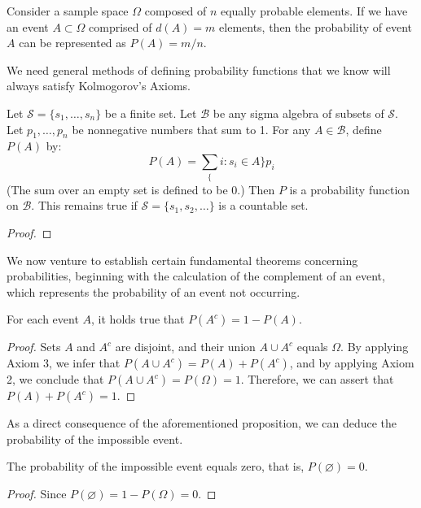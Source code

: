 \begin{example}
\label{ex:discrete_sample_space}
Consider a sample space $\Omega$ composed of $n$ equally probable elements. If we have an event $A \subset \Omega$ comprised of $d(A) = m$ elements, then the probability of event $A$ can be represented as $P(A) = m/n$.
\end{example}

{\color{red}

We need general methods of defining probability functions that we know will always satisfy Kolmogorov's Axioms.

\begin{proposition}
Let $\mathcal{S} = \{ s_1, \ldots, s_n \}$ be a finite set. Let $\mathcal{B}$ be any sigma algebra of subsets of $\mathcal{S}$. Let $p_1, \ldots, p_n$ be nonnegative numbers that sum to 1. For any $A \in \mathcal{B}$, define $P(A)$ by:
\[
P(A) = \sum_\{ i : s_i \in A \} p_i
\]
(The sum over an empty set is defined to be 0.) Then $P$ is a probability function on $\mathcal{B}$. This remains true if $\mathcal{S} = \{ s_1, s_2, \ldots \}$ is a countable set.
\end{proposition}
\begin{proof}
\end{proof}

}

We now venture to establish certain fundamental theorems concerning probabilities, beginning with the calculation of the complement of an event, which represents the probability of an event not occurring.

\begin{proposition}
For each event $A$, it holds true that $P \left( A^{c} \right) = 1 - P \left( A \right)$.
\end{proposition}
\begin{proof}
Sets $A$ and $A^c$ are disjoint, and their union $A \cup A^c$ equals $\Omega$. By applying Axiom 3, we infer that $P \left( A \cup A^c \right) = P \left( A \right) + P \left( A^c \right)$, and by applying Axiom 2, we conclude that $P \left( A \cup A^c \right) = P(\Omega) = 1$. Therefore, we can assert that $P \left( A \right) + P \left( A^c \right) = 1$.
\end{proof}

As a direct consequence of the aforementioned proposition, we can deduce the probability of the impossible event.

\begin{proposition}
The probability of the impossible event equals zero, that is, $P \left( \varnothing \right) = 0$.
\end{proposition}
\begin{proof}
Since $P \left( \varnothing \right) = 1 - P \left( \Omega \right) = 0$.
\end{proof}

